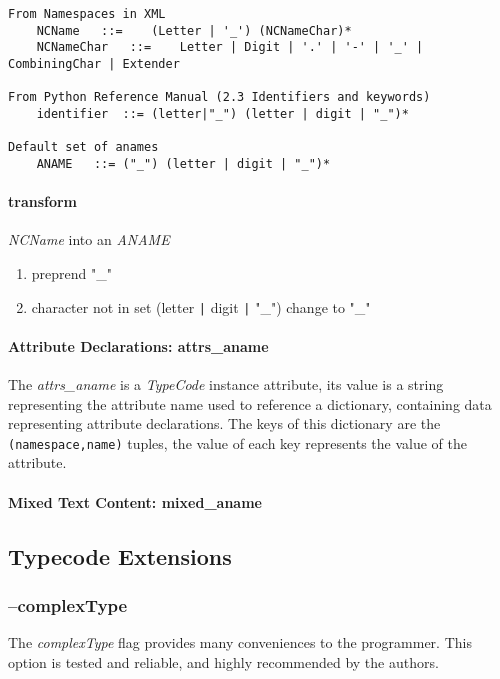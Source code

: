
\begin{verbatim}
From Namespaces in XML
	NCName	 ::=	(Letter | '_') (NCNameChar)*
	NCNameChar	 ::=	Letter | Digit | '.' | '-' | '_' | CombiningChar | Extender

From Python Reference Manual (2.3 Identifiers and keywords)
	identifier	::=	(letter|"_") (letter | digit | "_")*

Default set of anames
	ANAME	::=	("_") (letter | digit | "_")*
\end{verbatim}

\paragraph{transform} {\it NCName} into an {\it ANAME}
\begin{enumerate}
\item preprend "_"
\item character not in set (letter \verb!|! digit \verb!|! "_") change to "_"
\end{enumerate}

\paragraph{Attribute Declarations: attrs_aname}
The {\it attrs_aname} is a {\it TypeCode} instance attribute, its value is a string representing the
attribute name used to reference a dictionary, containing data representing
attribute declarations.  The keys of this dictionary are the
\verb!(namespace,name)! tuples, the value of each key represents the value of
the attribute.


\paragraph{Mixed Text Content: mixed_aname}

\subsection{Typecode Extensions}

\subsubsection{--complexType}
\label{subsubsection:complexType}
The {\it complexType} flag provides many conveniences to the programmer. This 
option is tested and reliable, and highly recommended by the authors.  

